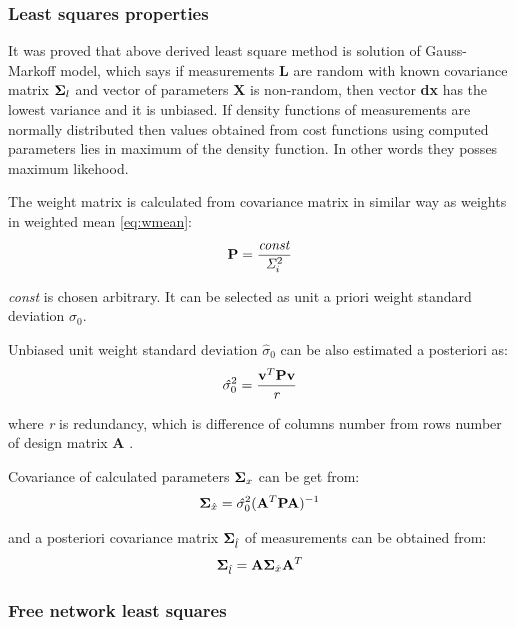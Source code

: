 \documentclass[a4paper,12pt]{article}
\newcommand{\ematr}[1]{
{\bf #1}
}
\newcommand{\evect}[1]{
{\bf #1}
}
\newcommand{\escal}[1]{
{\it #1}
}
\begin{document}
\subsubsection{Least squares properties}

It was proved that above derived least square method is solution of Gauss-Markoff model, which 
says if measurements \evect{L} are random with known covariance matrix $\ematr{\Sigma}_{l}$  and vector of parameters \evect{X} is non-random, then
vector \evect{dx}  has the lowest variance and it is unbiased. If density functions of measurements are normally 
distributed then values obtained from cost functions using  computed parameters lies in maximum of the density
function. In other words they posses maximum likehood.

The weight matrix is calculated from covariance matrix in similar way as weights in weighted mean \eqref{eq:wmean}:
\begin{equation}
\ematr{P} = \frac{\escal{const}}{\escal{\Sigma}_{i}^{2}}
\end{equation} 

\escal{const} is chosen arbitrary. It can be selected as unit a priori weight standard deviation $\sigma_{0}$. 


Unbiased unit weight standard deviation $\hat{\sigma}_{0}$ can be also estimated a posteriori as:
\begin{equation}
\escal{\hat{\sigma}}_{0}^{2} = \frac{\evect{v}^{T} \ematr{P}  \evect{v}}{\escal{r}}
\end{equation} 

where \escal{r} is redundancy, which is difference of columns number from rows number of design matrix \ematr{A}.

Covariance of calculated parameters $\ematr{\Sigma}_{x}$ can be get from:
\begin{equation}
\ematr{\Sigma}_{\hat{x}} = \escal{\hat{\sigma}}_{0}^{2} (\ematr{A}^{T} \ematr{P} \ematr{A})^{-1}
\end{equation} 

and a posteriori covariance matrix $\ematr{\Sigma}_{\hat{l}}$ of measurements can be obtained from:
\begin{equation}
\ematr{\Sigma}_{\hat{l}} =  \ematr{A} \ematr{\Sigma}_{\hat{x}} \ematr{A}^{T}
\end{equation} 

\subsubsection{Free network least squares}
\label{sec:free_net_least}
\end{document}
